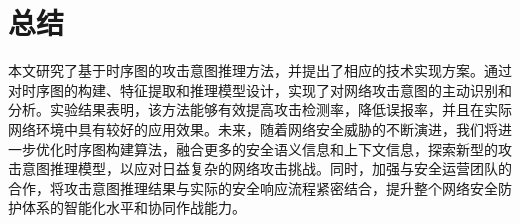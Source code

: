 \documentclass{article} %
\begin{document}
	\section{总结}
	
	本文研究了基于时序图的攻击意图推理方法，并提出了相应的技术实现方案。通过对时序图的构建、特征提取和推理模型设计，实现了对网络攻击意图的主动识别和分析。实验结果表明，该方法能够有效提高攻击检测率，降低误报率，并且在实际网络环境中具有较好的应用效果。\citep{Goodfellow2016}未来，随着网络安全威胁的不断演进，我们将进一步优化时序图构建算法\citep{Xu2021}，融合更多的安全语义信息和上下文信息，探索新型的攻击意图推理模型，以应对日益复杂的网络攻击挑战。同时，加强与安全运营团队的合作，将攻击意图推理结果与实际的安全响应流程紧密结合，提升整个网络安全防护体系的智能化水平和协同作战能力。
	
	
	
	
	
	
\end{document}
